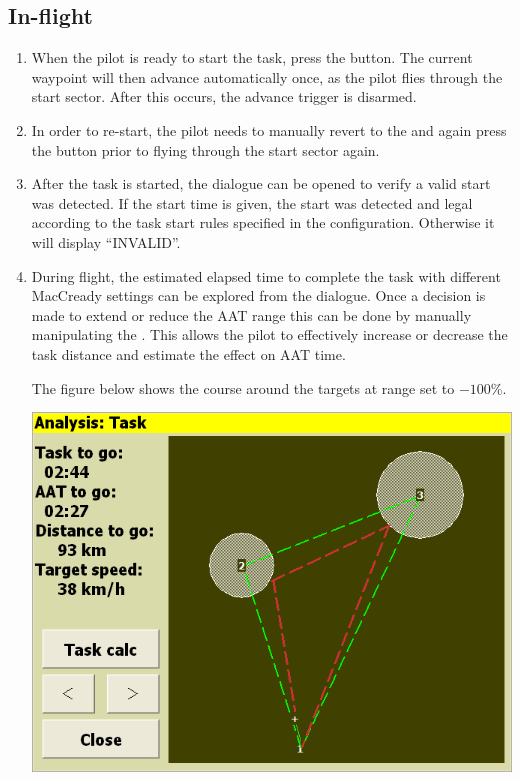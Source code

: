 \subsection*{In-flight}
\begin{enumerate}
\item  When the pilot is ready to start the task, press the  button.  The current waypoint will then advance automatically
  once, as the pilot flies through the start sector.  After this occurs, 
  the advance trigger is disarmed.  
\item  In order to re-start, the pilot needs to manually revert to the
 and again press the  button prior to
  flying through the start sector again.
\item  After the task is started, the  dialogue can be opened to
  verify a valid start was detected. If the start time is given, the start was 
  detected and legal according to the task start rules specified in the 
  configuration.  Otherwise it will display ``INVALID''.
\item  During flight, the estimated elapsed time to complete the task with
  different MacCready settings can be explored from the  dialogue.
  Once a decision is made to extend or reduce the AAT range this can be done by
  manually manipulating the . This allows the pilot to effectively
  increase or decrease the task distance and estimate the effect on AAT time.

The figure below shows the course around the targets at range set to $-100$\%.
\begin{center}
\includegraphics[angle=0,width=0.8\linewidth,keepaspectratio='true']{figures/aat-short.png}
\end{center}


\end{enumerate}
